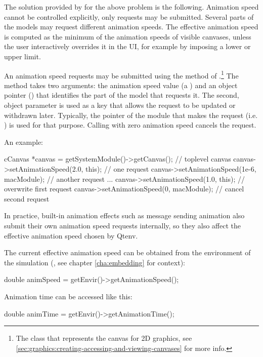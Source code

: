 The solution provided by {\opp} for the above problem is the following.
Animation speed cannot be controlled explicitly, only requests may be submitted.
Several parts of the models may request different animation speeds.
The effective animation speed is computed as the minimum of the animation
speeds of visible canvases, unless the user interactively overrides it in the UI,
for example by imposing a lower or upper limit.

An animation speed requests may be submitted using the 
method of .\footnote{The class that represents the canvas for
2D graphics, see \ref{sec:graphics:creating-accessing-and-viewing-canvases} for more
info.} The  method takes two arguments:
the animation speed value (a ) and an object pointer ()
that identifies the part of the model that requests it. The second, object parameter
is used as a key that allows the request to be updated or withdrawn later.
Typically, the pointer of the module that makes the request (i.e. ) is
used for that purpose. Calling  with zero animation
speed cancels the request.

An example:

\begin{cpp}
cCanvas *canvas = getSystemModule()->getCanvas(); // toplevel canvas
canvas->setAnimationSpeed(2.0, this); // one request
canvas->setAnimationSpeed(1e-6, macModule); // another request
...
canvas->setAnimationSpeed(1.0, this); // overwrite first request
canvas->setAnimationSpeed(0, macModule); // cancel second request
\end{cpp}

In practice, built-in animation effects such as message sending animation
also submit their own animation speed requests internally, so they also
affect the effective animation speed chosen by Qtenv.

The current effective animation speed can be obtained from the environment of the
simulation (, see chapter \ref{cha:embedding} for context):

\begin{cpp}
double animSpeed = getEnvir()->getAnimationSpeed();
\end{cpp}

Animation time can be accessed like this:

\begin{cpp}
double animTime = getEnvir()->getAnimationTime();
\end{cpp}


